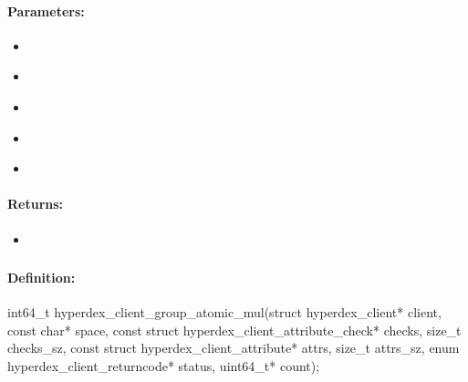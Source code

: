 \paragraph{Parameters:}
\begin{itemize}[noitemsep]
\item {}\\

\item {}\\

\item {}\\

\item {}\\

\item {}\\

\end{itemize}

\paragraph{Returns:}
\begin{itemize}[noitemsep]
\item {}\\

\end{itemize}

\pagebreak
\subsubsection{}
\label{api:c:group_atomic_mul}


\paragraph{Definition:}
\begin{ccode}
int64_t hyperdex_client_group_atomic_mul(struct hyperdex_client* client,
        const char* space,
        const struct hyperdex_client_attribute_check* checks, size_t checks_sz,
        const struct hyperdex_client_attribute* attrs, size_t attrs_sz,
        enum hyperdex_client_returncode* status,
        uint64_t* count);
\end{ccode}

